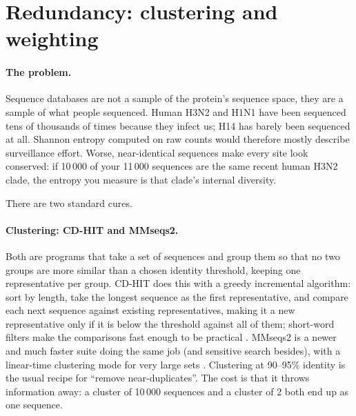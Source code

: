 \documentclass[11pt,a4paper]{article}
\begin{document}
\section{Redundancy: clustering and weighting}
\label{sec:redundancy}

\paragraph{The problem.}
Sequence databases are not a sample of the protein's sequence space, they are a
sample of what people sequenced. Human H3N2 and H1N1 have been sequenced tens of
thousands of times because they infect us; H14 has barely been sequenced at all.
Shannon entropy computed on raw counts would therefore mostly describe
surveillance effort. Worse, near-identical sequences make every site look
conserved: if 10\,000 of your 11\,000 sequences are the same recent human
H3N2 clade, the entropy you measure is that clade's internal diversity.

There are two standard cures.

\paragraph{Clustering: CD-HIT and MMseqs2.}
Both are programs that take a set of sequences and group them so that no two
groups are more similar than a chosen identity threshold, keeping one
representative per group. CD-HIT does this with a greedy incremental algorithm:
sort by length, take the longest sequence as the first representative, and
compare each next sequence against existing representatives, making it a new
representative only if it is below the threshold against all of them; short-word
filters make the comparisons fast enough to be practical
\cite{li2006,fu2012}. MMseqs2 is a newer and much faster suite doing the same
job (and sensitive search besides), with a linear-time clustering mode for very
large sets \cite{steinegger2017,steinegger2018}. Clustering at 90--95\% identity
is the usual recipe for ``remove near-duplicates''. The cost is that it throws
information away: a cluster of 10\,000 sequences and a cluster of 2 both end up
as one sequence.
\end{document}
